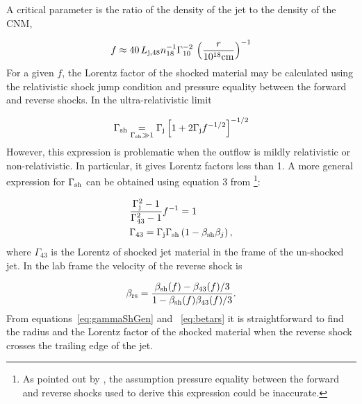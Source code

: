 \documentclass[usenatbib,fleqn]{mnras}
\begin{document}
A critical parameter is the ratio of the density of the jet to the
density of the CNM,

\begin{equation}
  f\approx 40\,  L_{\rm j,48} n_{18}^{-1} \Gamma_{10}^{-2} \, \left(\frac{r}{10^{18} {\rm
        cm}}\right)^{-1} 
\end{equation}
%
For a given $f$, the Lorentz factor of the shocked material may be
calculated using the relativistic shock jump condition and pressure
equality between the forward and reverse shocks. In the
ultra-relativistic limit 

\begin{equation}
\Gamma_{\rm sh} \underset{\Gamma_{\rm sh} \gg 1}= \Gamma_{\rm j}\left[1 + 2\Gamma_{\rm j}f^{-1/2}\right]^{-1/2}
\end{equation}
%
However, this expression is problematic when the outflow is mildly
relativistic or non-relativistic. In particular, it gives Lorentz
factors less than 1. A more general expression for $\Gamma_{\rm sh}$
can be obtained using equation 3 from
\citet{Beloborodov&Uhm2006}\footnote{As pointed out by
  \citet{Beloborodov&Uhm2006}, the assumption pressure equality
  between the forward and reverse shocks used to derive this
  expression could be inaccurate.}:

\begin{align}
&\frac{\Gamma_{\rm j}^2-1}{\Gamma_{43}^2-1} f^{-1}=1 \nonumber \\
&\Gamma_{43}=\Gamma_{\rm j} \Gamma_{\rm sh} \left(1-\beta_{\rm sh} \beta_j\right),
\label{eq:gammaShGen}
\end{align}
%
where $\Gamma_{43}$ is the Lorentz of shocked jet material in the
frame of the un-shocked jet. In the lab frame the velocity of the
reverse shock is

\begin{equation}
\beta_{\rm rs}=\frac{\beta_{\rm sh}(f)-\beta_{43}(f)/3}{1-\beta_{\rm
    sh}(f) \beta_{43}(f)/3}.
\label{eq:betars}
\end{equation} 
%
From equations~\eqref{eq:gammaShGen} and ~\eqref{eq:betars} it is
straightforward to find the radius and the Lorentz factor of the
shocked material when the reverse shock crosses the trailing edge of
the jet.



\clearpage
  \footnotesize{
    
    
  }
\end{document}
